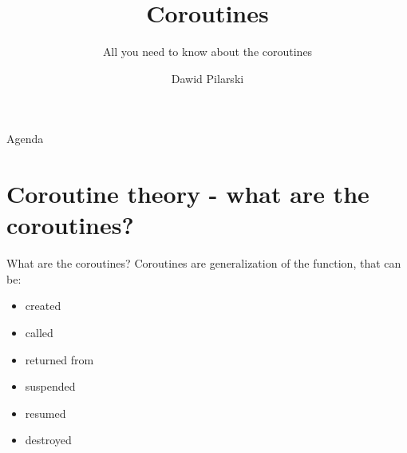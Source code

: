 \documentclass[10pt]{beamer}
\title{Coroutines}
\subtitle{All you need to know about the coroutines}
\date{}
\author{Dawid Pilarski}
\institute{dawid.pilarski@tomtom.com \\ blog.panicsoftware.com}
\begin{document}
\maketitle

\begin{frame}{Agenda}
\tableofcontents
\end{frame}

\section{Coroutine theory - what are the coroutines?}

\begin{frame}{What are the coroutines?}
\alert{Coroutines} are \alert{generalization} of the function, that can be:

\begin{itemize}[<+- |alert@+>]
\item created
\item called
\item returned from
\item suspended
\item resumed
\item destroyed
\end{itemize}

\end{frame}
\end{document}
